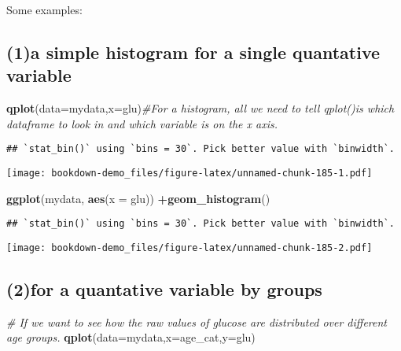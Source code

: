 \documentclass[]{book}
\newenvironment{Shaded}{\begin{snugshade}}{\end{snugshade}}
\newcommand{\KeywordTok}[1]{\textcolor[rgb]{0.13,0.29,0.53}{\textbf{#1}}}
\newcommand{\DataTypeTok}[1]{\textcolor[rgb]{0.13,0.29,0.53}{#1}}
\newcommand{\CommentTok}[1]{\textcolor[rgb]{0.56,0.35,0.01}{\textit{#1}}}
\newcommand{\OperatorTok}[1]{\textcolor[rgb]{0.81,0.36,0.00}{\textbf{#1}}}
\newcommand{\NormalTok}[1]{#1}
\theoremstyle{definition}
\theoremstyle{definition}
\theoremstyle{definition}
\theoremstyle{remark}
\begin{document}
Some examples:

\subsection{(1)a simple histogram for a single quantative
variable}\label{a-simple-histogram-for-a-single-quantative-variable}

\begin{Shaded}
\begin{Highlighting}[]
\KeywordTok{qplot}\NormalTok{(}\DataTypeTok{data=}\NormalTok{mydata,}\DataTypeTok{x=}\NormalTok{glu)}\CommentTok{#For a histogram, all we need to tell qplot()is which dataframe to look in and which variable is on the x axis. }
\end{Highlighting}
\end{Shaded}

\begin{verbatim}
## `stat_bin()` using `bins = 30`. Pick better value with `binwidth`.
\end{verbatim}

\texttt{[image: bookdown-demo\_files/figure-latex/unnamed-chunk-185-1.pdf]}

\begin{Shaded}
\begin{Highlighting}[]
\KeywordTok{ggplot}\NormalTok{(mydata, }\KeywordTok{aes}\NormalTok{(}\DataTypeTok{x =}\NormalTok{ glu)) }\OperatorTok{+}\KeywordTok{geom_histogram}\NormalTok{()}
\end{Highlighting}
\end{Shaded}

\begin{verbatim}
## `stat_bin()` using `bins = 30`. Pick better value with `binwidth`.
\end{verbatim}

\texttt{[image: bookdown-demo\_files/figure-latex/unnamed-chunk-185-2.pdf]}

\subsection{(2)for a quantative variable by
groups}\label{for-a-quantative-variable-by-groups}

\begin{Shaded}
\begin{Highlighting}[]
\CommentTok{# If we want to see how the raw values of glucose are distributed over different age groups.}
\KeywordTok{qplot}\NormalTok{(}\DataTypeTok{data=}\NormalTok{mydata,}\DataTypeTok{x=}\NormalTok{age_cat,}\DataTypeTok{y=}\NormalTok{glu)}
\end{Highlighting}
\end{Shaded}
\end{document}
